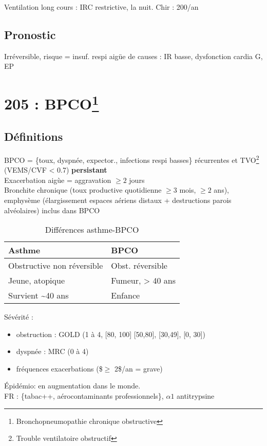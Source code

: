 Ventilation long cours : IRC restrictive, la nuit.
Chir : 200/an

\subsection{Pronostic}
\label{sec:org2ec66b4}
Irréversible, risque = insuf. respi aigüe de causes : IR basse, dysfonction
cardia G, EP


\section{205 : BPCO\footnote{Bronchopneumopathie chronique obstructive}}
\label{sec:205-bpco}

\subsection{Définitions}
BPCO = \{toux, dyspnée, expector., infections respi basses\} récurrentes et
TVO\footnote{Trouble ventilatoire obstructif} (VEMS/CVF < 0.7)
\textbf{persistant}\\
Exacerbation aigùe = aggravation \(\ge 2\) jours\\
Bronchite chronique (toux productive quotidienne \(\ge 3\) mois, \(\ge 2\) ans),
emphysème (élargissement espaces aériens distaux + destructions parois
alvéolaires) inclus dans BPCO\\
\begin{table}[htbp]
\caption{Différences asthme-BPCO}
\centering
\begin{tabular}{ll}
\toprule
Asthme & BPCO\\
\midrule
Obstructive non réversible & Obst. réversible\\
Jeune, atopique & Fumeur, > 40 ans\\
Survient \textasciitilde{}40 ans & Enfance\\
\bottomrule
\end{tabular}
\end{table}

Sévérité : 
\begin{itemize}
\item obstruction : GOLD (1 à 4, [80, 100] [50,80], [30,49], [0, 30])
\item dyspnée : MRC (0 à 4)
\item fréquences exacerbations (\$\(\ge\) 2\$/an = grave)
\end{itemize}

Épidémio: en augmentation dans le monde. \\
FR : \{tabac++, aérocontaminants professionnels\}, \(\alpha{}1\) antitrypsine

